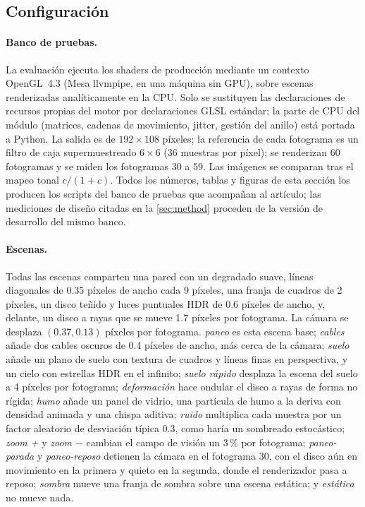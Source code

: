 \documentclass[11pt,a4paper]{article}
\begin{document}
\subsection{Configuración}

\paragraph{Banco de pruebas.} La evaluación ejecuta los shaders de producción mediante un contexto OpenGL~4.3 (Mesa llvmpipe, en una máquina sin GPU), sobre escenas renderizadas analíticamente en la CPU. Solo se sustituyen las declaraciones de recursos propias del motor por declaraciones GLSL estándar; la parte de CPU del módulo (matrices, cadenas de movimiento, jitter, gestión del anillo) está portada a Python. La salida es de $192\times108$ píxeles; la referencia de cada fotograma es un filtro de caja supermuestreado $6\times6$ (36 muestras por píxel); se renderizan 60 fotogramas y se miden los fotogramas 30 a 59. Las imágenes se comparan tras el mapeo tonal $c/(1+c)$. Todos los números, tablas y figuras de esta sección los producen los scripts del banco de pruebas que acompañan al artículo; las mediciones de diseño citadas en la \cref{sec:method} proceden de la versión de desarrollo del mismo banco.

\paragraph{Escenas.} Todas las escenas comparten una pared con un degradado suave, líneas diagonales de 0.35 píxeles de ancho cada 9 píxeles, una franja de cuadros de 2 píxeles, un disco teñido y luces puntuales HDR de 0.6 píxeles de ancho, y, delante, un disco a rayas que se mueve 1.7 píxeles por fotograma. La cámara se desplaza $(0.37, 0.13)$ píxeles por fotograma. \emph{paneo} es esta escena base; \emph{cables} añade dos cables oscuros de 0.4 píxeles de ancho, más cerca de la cámara; \emph{suelo} añade un plano de suelo con textura de cuadros y líneas finas en perspectiva, y un cielo con estrellas HDR en el infinito; \emph{suelo rápido} desplaza la escena del suelo a 4 píxeles por fotograma; \emph{deformación} hace ondular el disco a rayas de forma no rígida; \emph{humo} añade un panel de vidrio, una partícula de humo a la deriva con densidad animada y una chispa aditiva; \emph{ruido} multiplica cada muestra por un factor aleatorio de desviación típica 0.3, como haría un sombreado estocástico; \emph{zoom +} y \emph{zoom $-$} cambian el campo de visión un 3\,\% por fotograma; \emph{paneo-parada} y \emph{paneo-reposo} detienen la cámara en el fotograma 30, con el disco aún en movimiento en la primera y quieto en la segunda, donde el renderizador pasa a reposo; \emph{sombra} mueve una franja de sombra sobre una escena estática; y \emph{estática} no mueve nada.
\end{document}
